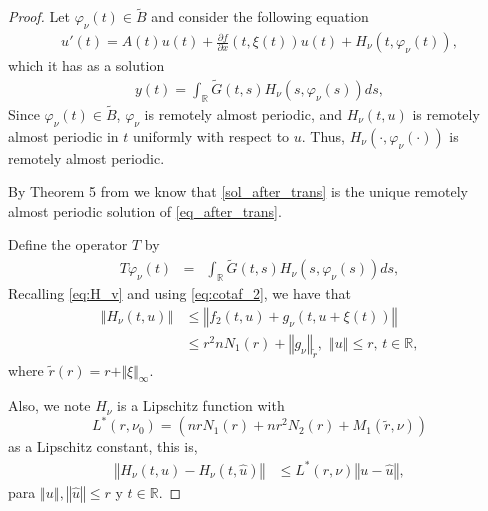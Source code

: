 \documentclass[english,reqno]{amsart}
\numberwithin{equation}{section}
\theoremstyle{plain}
\theoremstyle{definition}
\theoremstyle{remark}
\begin{document}
\begin{proof}
Let $\varphi_{\nu}\left(t\right)\in\widetilde{B}$ and consider the following equation
\begin{eqnarray}
u'\left(t\right) =  A\left(t\right)u\left(t\right)+\frac{\partial f}{\partial x}\left(t,\xi\left(t\right)\right)u\left(t\right)+H_{\nu}\left(t,\varphi_{\nu}\left(t\right)\right),\label{eq_after_trans}
\end{eqnarray}
which it has as a solution
\begin{eqnarray}
y(t)=\int_{\mathbb{R}}\tilde{G}\left(t,s\right)H_{\nu}\left(s,\varphi_{\nu}\left(s\right)\right)ds, \label{sol_after_trans}
\end{eqnarray}
Since $\varphi_{\nu}\left(t\right)\in\widetilde{B}$, $\varphi_{\nu}$ is remotely almost periodic, and $H_{\nu}\left(t,u\right)$ is remotely almost periodic in $t$ uniformly with respect to $u$. Thus, $H_{\nu}\left(\cdot,\varphi_{\nu}\left(\cdot\right)\right)$ is remotely almost periodic.

By Theorem 5 from \cite{pinto_remotely} we know that \eqref{sol_after_trans} is the unique remotely almost periodic solution of \eqref{eq_after_trans}.

Define the operator $T$ by
\begin{eqnarray*}
T\varphi_{\nu}\left(t\right) & = & \int_{\mathbb{R}}\tilde{G}\left(t,s\right)H_{\nu}\left(s,\varphi_{\nu}\left(s\right)\right)ds,
\end{eqnarray*}
Recalling \eqref{eq:H_v} and using \eqref{eq:cotaf_2}, we have that
\begin{align}
\left\Vert H_{\nu}\left(t,u\right)\right\Vert  & \leq\left\Vert f_{2}\left(t,u\right)+ g_{\nu}\left(t,u+\xi\left(t\right)\right)\right\Vert \nonumber \\
 & \leq r^{2}nN_{1}\left(r\right)+\left\Vert g_{\nu}\right\Vert _{\tilde{r}},\,\,\left\Vert u\right\Vert \leq r,\, t\in\mathbb{R},\label{eq:cotaHV}
\end{align}
where $\tilde{r}(r)=r+\Vert \xi \Vert_{\infty}$.

Also, we note $H_{\nu}$ is a Lipschitz function with $$L^{*}\left(r,\nu_{0}\right)=\left(nrN_{1}\left(r\right)+nr^{2}N_{2}\left(r\right)+M_{1}\left(\tilde{r},\nu\right)\right)$$
as a Lipschitz constant, this is, 
\begin{align}
\left\Vert H_{\nu}\left(t,u\right)-H_{\nu}\left(t,\hat{u}\right)\right\Vert  
 & \leq L^{*}(r,\nu)\left\Vert u-\hat{u}\right\Vert ,\label{eq:HV_lipschitz}
\end{align}
para $\left\Vert u\right\Vert ,\left\Vert \hat{u}\right\Vert \leq r$
y $t\in\mathbb{R}$.


\end{proof}
\end{document}
